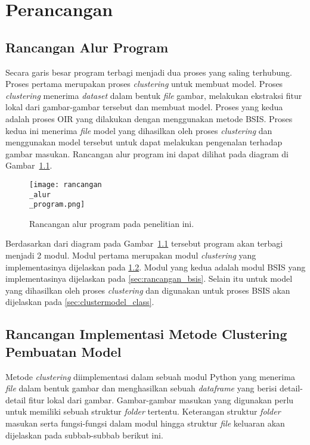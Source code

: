\chapter{Perancangan}

\section{Rancangan Alur Program}
Secara garis besar program terbagi menjadi dua proses yang saling terhubung. Proses pertama merupakan proses \textit{clustering} untuk membuat model. Proses \textit{clustering} menerima \textit{dataset} dalam bentuk \textit{file} gambar, melakukan ekstraksi fitur lokal dari gambar-gambar tersebut dan membuat model. Proses yang kedua adalah proses OIR yang dilakukan dengan menggunakan metode BSIS. Proses kedua ini menerima \textit{file} model yang dihasilkan oleh proses \textit{clustering} dan menggunakan model tersebut untuk dapat melakukan pengenalan terhadap gambar masukan. Rancangan alur program ini dapat dilihat pada diagram di Gambar~\ref{fig:rancangan_alur_program}.
\begin{figure}[H]
	\centering
	\texttt{[image: rancangan\\\_alur\\\_program.png]}
	\caption{Rancangan alur program pada penelitian ini.}
	\label{fig:rancangan_alur_program}
\end{figure}
Berdasarkan dari diagram pada Gambar~\ref{fig:rancangan_alur_program} tersebut program akan terbagi menjadi 2 modul. Modul pertama merupakan modul \textit{clustering} yang implementasinya dijelaskan pada \ref{sec:rancangan_clustering}. Modul yang kedua adalah modul BSIS yang implementasinya dijelaskan pada \ref{sec:rancangan_bsis}. Selain itu untuk model yang dihasilkan oleh proses \textit{clustering} dan digunakan untuk proses BSIS akan dijelaskan pada \ref{sec:clustermodel_class}.

\section{Rancangan Implementasi Metode Clustering Pembuatan Model} 
\label{sec:rancangan_clustering}
Metode \textit{clustering} diimplementasi dalam sebuah modul Python yang menerima \textit{file} dalam bentuk gambar dan menghasilkan sebuah \textit{dataframe} yang berisi detail-detail fitur lokal dari gambar. Gambar-gambar masukan yang digunakan perlu untuk memiliki sebuah struktur \textit{folder} tertentu. Keterangan struktur \textit{folder} masukan serta fungsi-fungsi dalam modul hingga struktur \textit{file} keluaran akan dijelaskan pada subbab-subbab berikut ini.

